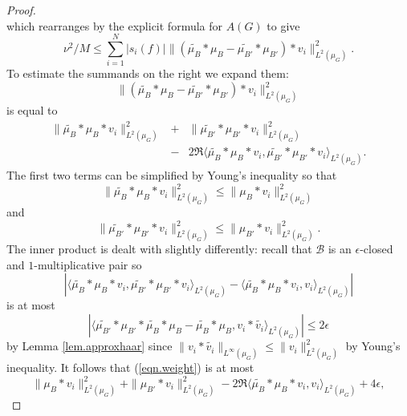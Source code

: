 \documentclass[12pt]{amsart}
\numberwithin{equation}{section}
\theoremstyle{plain}
\theoremstyle{definition}
\renewcommand{\leq}{\leqslant}
\begin{document}
\begin{proof}
\begin{equation*}
\end{equation*}
which rearranges by the explicit formula for $A(G)$ to give
\begin{equation}\label{eqn.kuh}
\nu^2/M \leq\sum_{i=1}^N{|s_i(f)|\|(\widetilde{\mu_B}\ast \mu_B - \widetilde{\mu_{B'}}\ast \mu_{B'}) \ast v_i\|_{L^2(\mu_G)}^2}.
\end{equation}
To estimate the summands on the right we expand them:
\begin{equation}\label{eqn.weight}
\|(\widetilde{\mu_B}\ast \mu_B - \widetilde{\mu_{B'}}\ast \mu_{B'}) \ast v_i\|_{L^2(\mu_G)}^2
\end{equation}
is equal to
\begin{eqnarray*}
\|\widetilde{\mu_B}\ast \mu_B\ast v_i\|_{L^2(\mu_G)}^2& +& \|\widetilde{\mu_{B'}}\ast \mu_{B'} \ast v_i\|_{L^2(\mu_G)}^2\\ &-&2\Re \langle \widetilde{\mu_B}\ast \mu_B\ast v_i,\widetilde{\mu_{B'}}\ast \mu_{B'} \ast v_i\rangle_{L^2(\mu_G)}.
\end{eqnarray*}
The first two terms can be simplified by Young's inequality so that
\begin{equation*}
\|\widetilde{\mu_B}\ast \mu_B\ast v_i\|_{L^2(\mu_G)}^2\leq\|\mu_B\ast v_i\|_{L^2(\mu_G)}^2
\end{equation*}
and
\begin{equation*}
\|\widetilde{\mu_{B'}}\ast \mu_{B'}\ast v_i\|_{L^2(\mu_G)}^2\leq\|\mu_{B'}\ast v_i\|_{L^2(\mu_G)}^2.
\end{equation*}
The inner product is dealt with slightly differently: recall that $\mathcal{B}$ is an $\epsilon$-closed and $1$-multiplicative pair so
\begin{equation*}
| \langle \widetilde{\mu_B}\ast \mu_B\ast v_i,\widetilde{\mu_{B'}}\ast \mu_{B'} \ast v_i\rangle_{L^2(\mu_G)}- \langle \widetilde{\mu_B}\ast \mu_B\ast v_i,v_i\rangle_{L^2(\mu_G)}|
\end{equation*}
is at most
\begin{equation*}
|\langle\widetilde{\mu_{B'}}\ast \mu_{B'} \ast \widetilde{\mu_B}\ast \mu_B- \widetilde{\mu_B}\ast \mu_B,v_i \ast \widetilde{v_i}\rangle_{L^2(\mu_G)}| \leq 2\epsilon
\end{equation*}
by Lemma \ref{lem.approxhaar} since $\|v_i \ast \widetilde{v_i}\|_{L^\infty(\mu_G)} \leq \|v_i\|_{L^2(\mu_G)}^2$ by Young's inequality.  It follows that (\ref{eqn.weight}) is at most
\begin{equation*}
\|\mu_B\ast v_i\|_{L^2(\mu_G)}^2 + \|\mu_{B'} \ast v_i\|_{L^2(\mu_G)}^2 -2\Re \langle \widetilde{\mu_B}\ast \mu_B\ast v_i,v_i\rangle_{L^2(\mu_G)}+4\epsilon,

\end{equation*}
\end{proof}
\end{document}

